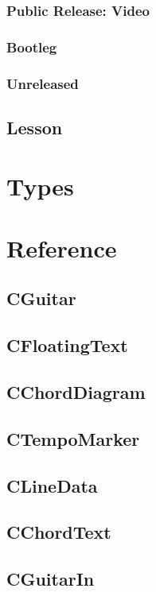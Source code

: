 \documentclass[a4paper]{article}
\begin{document}
\subsubsection{Public Release: Video}
\subsubsection{Bootleg}
\subsubsection{Unreleased}

\subsection{Lesson}

\section{Types}

\section{Reference}

\subsection{CGuitar}

\subsection{CFloatingText}
\subsection{CChordDiagram}
\subsection{CTempoMarker}
\subsection{CLineData}
\subsection{CChordText}
\subsection{CGuitarIn}
\end{document}
